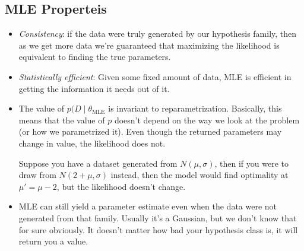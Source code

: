 \subsection{MLE Properteis}
\begin{itemize}
	\item \textit{Consistency}: if the data were truly generated by our hypothesis
		family, then as we get more data we're guaranteed that maximizing the
		likelihood is equivalent to finding the true parameters. 
	\item \textit{Statistically efficient}: Given some fixed amount of data, MLE is
		efficient in getting the information it needs out of it.  
	\item The value of \( p(D \mid \theta_{\text{MLE}} \) is invariant to
		reparametrization. Basically, this means that the value of \( p \) doesn't
		depend on the way we look at the problem (or how we parametrized it). Even
		though the returned parameters may change in value, the likelihood does not. 

		Suppose you have a dataset generated from \( N(\mu, \sigma) \), then 
		if you were to draw from \( N(2 + \mu, \sigma) \) instead, then the model
		would find optimality at \( \mu' = \mu - 2 \), but the likelihood doesn't
		change.   
	\item MLE can still yield a parameter estimate even when the data were not
		generated from that family. Usually it's a Gaussian, but we don't know that
		for sure obviously. It doesn't matter how bad your hypothesis class is, it
		will return you a value.  
\end{itemize}
